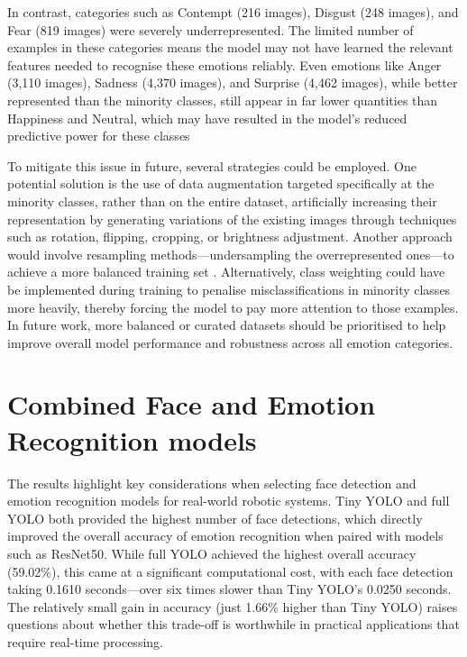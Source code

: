 In contrast, categories such as Contempt (216 images), Disgust (248 images), and Fear (819 images) were severely underrepresented. The limited number of examples in these categories means the model may not have learned the relevant features needed to recognise these emotions reliably. Even emotions like Anger (3,110 images), Sadness (4,370 images), and Surprise (4,462 images), while better represented than the minority classes, still appear in far lower quantities than Happiness and Neutral, which may have resulted in the model's reduced predictive power for these classes

To mitigate this issue in future, several strategies could be employed. One potential solution is the use of data augmentation targeted specifically at the minority classes, rather than on the entire dataset, artificially increasing their representation by generating variations of the existing images through techniques such as rotation, flipping, cropping, or brightness adjustment. Another approach would involve resampling methods—undersampling the overrepresented ones—to achieve a more balanced training set \cite{Mohammed2020-bz}. Alternatively, class weighting \cite{Johnson2019-xc} could have be implemented during training to penalise misclassifications in minority classes more heavily, thereby forcing the model to pay more attention to those examples. In future work, more balanced or curated datasets should be prioritised to help improve overall model performance and robustness across all emotion categories.

\section{Combined Face and Emotion Recognition models}

The results highlight key considerations when selecting face detection and emotion recognition models for real-world robotic systems. Tiny YOLO and full YOLO both provided the highest number of face detections, which directly improved the overall accuracy of emotion recognition when paired with models such as ResNet50. While full YOLO achieved the highest overall accuracy (59.02\%), this came at a significant computational cost, with each face detection taking 0.1610 seconds—over six times slower than Tiny YOLO's 0.0250 seconds. The relatively small gain in accuracy (just 1.66\% higher than Tiny YOLO) raises questions about whether this trade-off is worthwhile in practical applications that require real-time processing.

